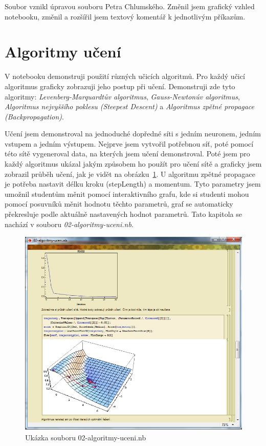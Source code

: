 \documentclass[11pt,twoside,a4paper]{book}
\begin{document}
Soubor vznikl úpravou souboru Petra Chlumského.\cite{chlumsky} Změnil jsem grafický vzhled notebooku, změnil a rozšířil jsem textový komentář k jednotlivým příkazům.

\section{Algoritmy učení}
V notebooku demonstruji použití různých učicích algoritmů. Pro každý učicí algoritmus graficky zobrazuji jeho postup při učení. Demonstruji zde tyto algoritmy: \textit{Levenberg-Marquardtův algoritmus}, \textit{Gauss-Newtonúv algoritmus}, \textit{Algoritmus nejvyššího poklesu (Steepest Descent)} a \textit{Algoritmus zpětné propagace (Backpropagation)}.

Učení jsem demonstroval na jednoduché dopředné síti s jedním neuronem, jedním vstupem a jedním výstupem. Nejprve jsem vytvořil potřebnou síť, poté pomocí této sítě vygeneroval data, na kterých jsem učení demonstroval. Poté jsem pro každý algoritmus ukázal jakým způsobem ho použít pro učení sítě a graficky jsem zobrazil průběh učení, jak je vidět na obrázku~\ref{fig:algoritmy-uceni}. U algoritmu zpětné propagace je potřeba nastavit délku kroku (stepLength) a momentum. Tyto parametry jsem umožnil studentům měnit pomocí interaktivního grafu, kde si studenti mohou pomocí posuvníků měnit hodnotu těchto parametrů, graf se automaticky překresluje podle aktuálně nastavených hodnot parametrů. Tato kapitola se nachází v souboru \textit{02-algoritmy-uceni.nb}.

\begin{figure}[h!]
\begin{center}
\includegraphics[height=10cm]{figures/ukazka02.png}
\caption{Ukázka souboru 02-algoritmy-uceni.nb}
\label{fig:algoritmy-uceni}
\end{center}
\end{figure}
\newpage
\end{document}
